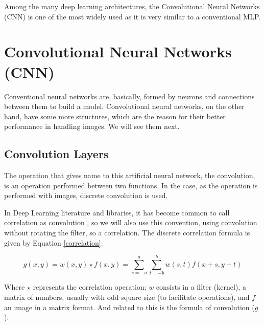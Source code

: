 Among the many deep learning architectures, the Convolutional Neural Networks (CNN) is one of the most widely used as it is very similar to a conventional MLP.

\section{Convolutional Neural Networks (CNN)}

Conventional neural networks are, basically, formed by neurons and connections between them to build a model. Convolutional neural networks, on the other hand, have some more structures, which are the reason for their better performance in handling images. We will see them next.


\subsection{Convolution Layers}

The operation that gives name to this artificial neural network, the convolution, is an operation performed between two functions. In the case, as the operation is performed with images, discrete convolution is used.


In Deep Learning  literature and libraries, it has become common to call correlation as convolution \cite{goodfellow2016}, so we will also use this convention, using convolution without rotating the filter, so a correlation.
The discrete correlation formula is given by Equation \ref{correlation}:

\begin{equation}
\label{correlation}
g(x,y)=w(x,y)\star f(x,y)=\sum_{s=-a}^a\sum_{t=-b}^bw(s,t)f(x+s,y+t)
\end{equation}

\noindent Where $\star$ represents the correlation operation; $w$ consists in a filter (kernel), a matrix of numbers, usually with odd square size (to facilitate operations), and $f$ an image in a matrix format. And related to this is the formula of convolution ($g$):


